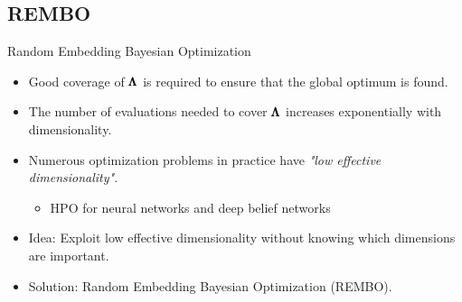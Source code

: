 \subsection{REMBO}
\begin{frame}[c]{Random Embedding Bayesian Optimization}
\begin{itemize}
    \item Good coverage of $\pmb{\Lambda}$ is required to ensure that the global optimum is found.
    \pause
    \item The number of evaluations needed to cover $\pmb{\Lambda}$ increases exponentially with dimensionality.
    \pause
    \item Numerous optimization problems in practice have \emph{"low effective dimensionality"}.
    \begin{itemize}
    \pause
        \item HPO for neural networks and deep belief networks
    \end{itemize}
    \pause
    \item Idea: Exploit low effective dimensionality without knowing which dimensions are important.
    \pause
    \item Solution: Random Embedding Bayesian Optimization (REMBO).
\end{itemize}

\end{frame}

